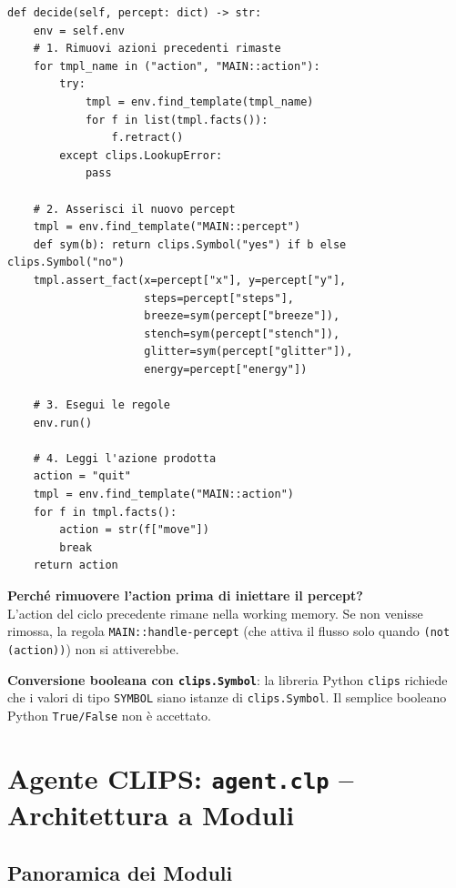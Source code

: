 \documentclass[12pt,a4paper]{article}
\begin{document}
\begin{lstlisting}[language=Python3]
def decide(self, percept: dict) -> str:
    env = self.env
    # 1. Rimuovi azioni precedenti rimaste
    for tmpl_name in ("action", "MAIN::action"):
        try:
            tmpl = env.find_template(tmpl_name)
            for f in list(tmpl.facts()):
                f.retract()
        except clips.LookupError:
            pass

    # 2. Asserisci il nuovo percept
    tmpl = env.find_template("MAIN::percept")
    def sym(b): return clips.Symbol("yes") if b else clips.Symbol("no")
    tmpl.assert_fact(x=percept["x"], y=percept["y"],
                     steps=percept["steps"],
                     breeze=sym(percept["breeze"]),
                     stench=sym(percept["stench"]),
                     glitter=sym(percept["glitter"]),
                     energy=percept["energy"])

    # 3. Esegui le regole
    env.run()

    # 4. Leggi l'azione prodotta
    action = "quit"
    tmpl = env.find_template("MAIN::action")
    for f in tmpl.facts():
        action = str(f["move"])
        break
    return action
\end{lstlisting}

\textbf{Perché rimuovere l'action prima di iniettare il percept?} \\
L'action del ciclo precedente rimane nella working memory. Se non venisse
rimossa, la regola \texttt{MAIN::handle-percept} (che attiva il flusso solo
quando \texttt{(not (action))}) non si attiverebbe.

\textbf{Conversione booleana con \texttt{clips.Symbol}}: la libreria Python
\texttt{clips} richiede che i valori di tipo \texttt{SYMBOL} siano istanze
di \texttt{clips.Symbol}. Il semplice booleano Python \texttt{True/False} non
è accettato.

\section{Agente CLIPS: \texttt{agent.clp} -- Architettura a Moduli}

\subsection{Panoramica dei Moduli}
\end{document}
